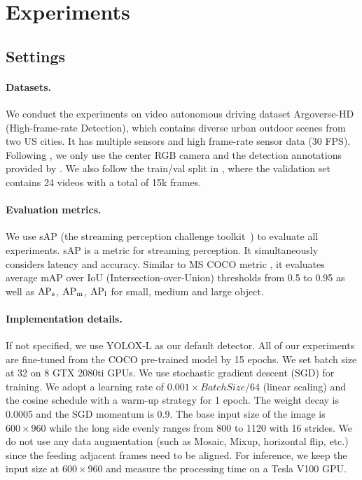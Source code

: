\documentclass[10pt,twocolumn,letterpaper]{article}
\begin{document}
\section{Experiments}
\label{sec:exp}



\subsection{Settings}

\paragraph{Datasets.} We conduct the experiments on video autonomous driving dataset Argoverse-HD \cite{argoverse,streamer} (High-frame-rate Detection),  which contains diverse urban outdoor scenes from two US cities. It has multiple sensors and high frame-rate sensor data (30 FPS).
Following \cite{streamer}, we only use the center RGB camera and the detection annotations provided by \cite{streamer}. We also follow the train/val split in \cite{streamer}, where the validation set contains 24 videos with a total of 15k frames.

\paragraph{Evaluation metrics.} We use sAP \cite{streamer} (the streaming perception challenge toolkit~\cite{sAP}) to evaluate all experiments. sAP is a metric for streaming perception. It simultaneously considers latency and accuracy. Similar to MS COCO metric \cite{coco}, it evaluates average mAP over IoU (Intersection-over-Union) thresholds from 0.5 to 0.95 as well as $\rm AP_{s}$, $\rm AP_{m}$, $\rm AP_{l}$ for small, medium and large object.

\paragraph{Implementation details.} If not specified, we use YOLOX-L \cite{yolox} as our default detector. All of our experiments are fine-tuned from the COCO pre-trained model by 15 epochs. We set batch size at 32 on 8 GTX 2080ti GPUs. We use stochastic gradient descent (SGD) for training. We adopt a learning rate of $0.001 \times BatchSize / 64$ (linear scaling\cite{linear}) and the cosine schedule with a warm-up strategy for 1 epoch. The weight decay is 0.0005 and the SGD momentum is 0.9. The base input size of the image is $600 \times 960$ while the long side evenly ranges from 800 to 1120 with 16 strides. We do not use any data augmentation (such as Mosaic\cite{yolo5}, Mixup\cite{mixup}, horizontal flip, etc.) since the feeding adjacent frames need to be aligned. For inference, we keep the input size at $600 \times 960$ and measure the processing time on a Tesla V100 GPU. 
\end{document}
